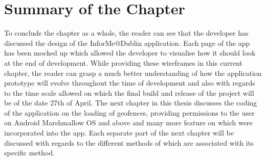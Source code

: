 \section{Summary of the Chapter}
To conclude the chapter as a whole, the reader can see that the developer has discussed the design of the InforMe@Dublin application. Each page of the app has been mocked up which allowed the developer to visualise how it should look at the end of development. While providing these wireframes in this current chapter, the reader can grasp a much better understanding of how the application prototype will evolve throughout the time of development and also with regards to the time scale allowed on which the final build and release of the project will be of the date 27th of April. The next chapter in this thesis discusses the coding of the application on the loading of geofences, providing permissions to the user on Android Marshmallow OS and above and many more feature on which were incorporated into the app. Each separate part of the next chapter will be discussed with regards to the different methods of which are associated with its specific method. 